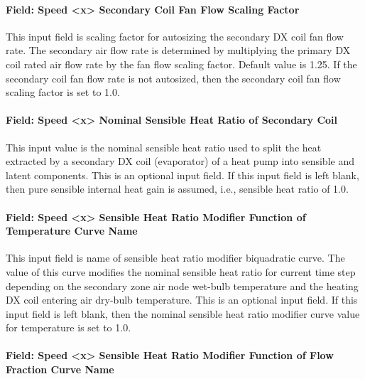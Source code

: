 \paragraph{Field: Speed \textless{}x\textgreater{} Secondary Coil Fan Flow Scaling Factor}\label{field-speed-x-secondary-coil-fan-flow-scaling-factor}

This input field is scaling factor for autosizing the secondary DX coil fan flow rate. The secondary air flow rate is determined by multiplying the primary DX coil rated air flow rate by the fan flow scaling factor. Default value is 1.25. If the secondary coil fan flow rate is not autosized, then the secondary coil fan flow scaling factor is set to 1.0.

\paragraph{Field: Speed \textless{}x\textgreater{} Nominal Sensible Heat Ratio of Secondary Coil}\label{field-speed-x-nominal-sensible-heat-ratio-of-secondary-coil}

This input value is the nominal sensible heat ratio used to split the heat extracted by a secondary DX coil (evaporator) of a heat pump into sensible and latent components. This is an optional input field. If this input field is left blank, then pure sensible internal heat gain is assumed, i.e., sensible heat ratio of 1.0.

\paragraph{Field: Speed \textless{}x\textgreater{} Sensible Heat Ratio Modifier Function of Temperature Curve Name}\label{field-speed-x-sensible-heat-ratio-modifier-function-of-temperature-curve-name}

This input field is name of sensible heat ratio modifier biquadratic curve. The value of this curve modifies the nominal sensible heat ratio for current time step depending on the secondary zone air node wet-bulb temperature and the heating DX coil entering air dry-bulb temperature. This is an optional input field. If this input field is left blank, then the nominal sensible heat ratio modifier curve value for temperature is set to 1.0.

\paragraph{Field: Speed \textless{}x\textgreater{} Sensible Heat Ratio Modifier Function of Flow Fraction Curve Name}\label{field-speed-x-sensible-heat-ratio-modifier-function-of-flow-fraction-curve-name}

